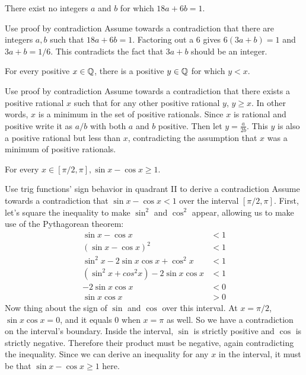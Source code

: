 \documentclass{article}
\begin{document}
\begin{problem}
    There exist no integers $a$ and $b$ for which $18a + 6b = 1$.
\end{problem}
\begin{solution}{Use proof by contradiction}
    Assume towards a contradiction that there are integers $a, b$ such that $18a + 6b = 1$. Factoring out a 6 gives $6(3a + b) = 1$ and $3a + b = 1/6$. This contradicts the fact that $3a + b$ should be an integer.
\end{solution}

\begin{problem}
    For every positive $x \in \mathbb{Q}$, there is a positive $y \in \mathbb{Q}$ for which $y < x$.
\end{problem}
\begin{solution}{Use proof by contradiction}
    Assume towards a contradiction that there exists a positive rational $x$ such that for any other positive rational $y$, $y \geq x$. In other words, $x$ is a minimum in the set of positive rationals. Since $x$ is rational and positive write it as $a/b$ with both $a$ and $b$ positive. Then let $y = \frac{a}{2b}$. This $y$ is also a positive rational but less than $x$, contradicting the assumption that $x$ was a minimum of positive rationals.
\end{solution}

\begin{problem}
    For every $x \in [\pi/2, \pi], \sin x - \cos x \geq 1$.
\end{problem}
\begin{solution}{Use trig functions' sign behavior in quadrant II to derive a contradiction}
    Assume towards a contradiction that $\sin x - \cos x < 1$ over the interval $[\pi/2, \pi]$. First, let's square the inequality to make $\sin^2$ and $\cos^2$ appear, allowing us to make use of the Pythagorean theorem:
    \begin{align*}
       \sin x - \cos x &< 1 \\
       (\sin x - \cos x)^2 &< 1 \\
       \sin^2 x - 2\sin x \cos x + \cos^2 x &< 1 \\
       (\sin^2 x + cos^2 x) - 2\sin x \cos x &< 1 \\ 
       -2\sin x \cos x &< 0 \\
        \sin x \cos x &> 0
    \end{align*}
    Now thing about the sign of $\sin$ and $\cos$ over this interval. At $x = \pi / 2$, $\sin x \cos x = 0$, and it equals 0 when $x = \pi$ as well. So we have a contradiction on the interval's boundary. Inside the interval, $\sin$ is strictly positive and $\cos$ is strictly negative. Therefore their product must be negative, again contradicting the inequality. Since we can derive an inequality for any $x$ in the interval, it must be that $\sin x - \cos x \geq 1$ here. 
\end{solution}
\end{document}
